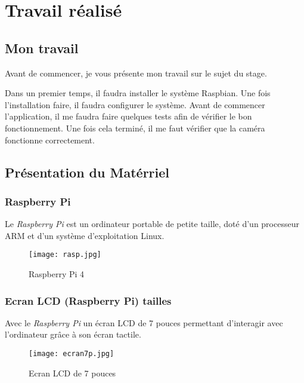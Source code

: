 \chapter{Travail réalisé}
    \section{Mon travail}
    \begin{flushleft}
        Avant de commencer, je vous présente mon travail sur le sujet du stage.

        \vspace{0.2cm}
    
        Dans un premier temps, il faudra installer le système Raspbian.
        Une fois l'installation faire, il faudra configurer le système.
        Avant de commencer l'application, il me faudra faire quelques tests afin de vérifier le bon fonctionnement.
        Une fois cela terminé, il me faut vérifier que la caméra fonctionne correctement.    
    \end{flushleft}

    \section{Présentation du Matérriel}
        \subsection{Raspberry Pi}
        Le \textit{Raspberry Pi} est un ordinateur portable de petite taille, doté d'un processeur ARM et d'un système d'exploitation Linux.
        \begin{figure}[h]
            \centering
            \texttt{[image: rasp.jpg]}
            \caption{Raspberry Pi 4}
        \end{figure}

        \subsection{Ecran LCD (Raspberry Pi) tailles}
        Avec le \textit{Raspberry Pi} un écran LCD de 7 pouces permettant d'interagir avec l'ordinateur grâce à son écran tactile. 
        \begin{figure}[h]
            \centering
            \texttt{[image: ecran7p.jpg]} 
            \caption{Ecran LCD de 7 pouces}
        \end{figure}

